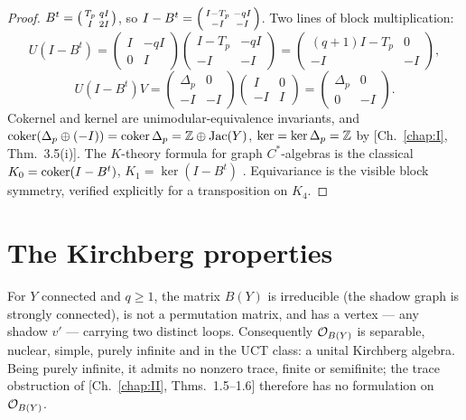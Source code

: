 \begin{proof}
$B^t=\begin{psmallmatrix}T_p&qI\\I&2I\end{psmallmatrix}$, so
$I-B^t=\begin{psmallmatrix}I-T_p&-qI\\-I&-I\end{psmallmatrix}$. Two lines of block
multiplication:
\[
U(I-B^t)=\begin{pmatrix}I&-qI\\0&I\end{pmatrix}
\begin{pmatrix}I-T_p&-qI\\-I&-I\end{pmatrix}
=\begin{pmatrix}(q+1)I-T_p&0\\-I&-I\end{pmatrix},
\]
\[
U(I-B^t)V=\begin{pmatrix}\Delta_p&0\\-I&-I\end{pmatrix}
\begin{pmatrix}I&0\\-I&I\end{pmatrix}
=\begin{pmatrix}\Delta_p&0\\0&-I\end{pmatrix}.
\]
Cokernel and kernel are unimodular-equivalence invariants, and
$\operatorname{coker}(\Delta_p\oplus(-I))=\operatorname{coker}\Delta_p=\mathbb{Z}\oplus\operatorname{Jac}(Y)$,
$\ker=\ker\Delta_p=\mathbb{Z}$ by [Ch.~\ref{chap:I}, Thm.~3.5(i)]. The $K$-theory formula for graph
$C^*$-algebras is the classical
$K_0=\operatorname{coker}(I-B^t)$, $K_1=\ker(I-B^t)$ \cite{CK}. Equivariance is the visible block
symmetry, verified explicitly for a transposition on $K_4$.
\end{proof}

\section{The Kirchberg properties}\label{VI:sec:kirchberg}

\begin{theorem}\label{VI:thm:kirchberg}
For $Y$ connected and $q\ge1$, the matrix $B(Y)$ is irreducible (the shadow graph is
strongly connected), is not a permutation matrix, and has a vertex --- any shadow
$v'$ --- carrying two distinct loops. Consequently $\mathcal{O}_{B(Y)}$ is separable,
nuclear, simple, purely infinite and in the UCT class: a unital Kirchberg algebra.
Being purely infinite, it admits no nonzero trace, finite or semifinite; the trace
obstruction of {\rm[Ch.~\ref{chap:II}, Thms.~1.5--1.6]} therefore has no formulation on
$\mathcal{O}_{B(Y)}$.
\end{theorem}


